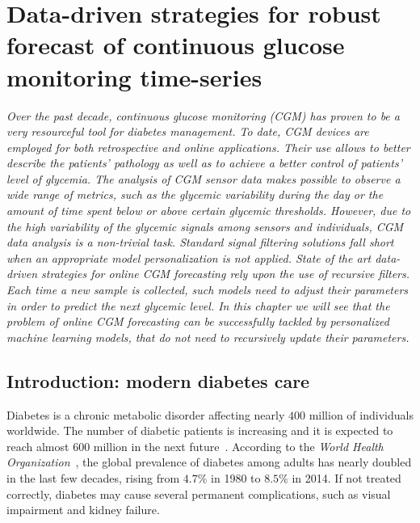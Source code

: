 
\chapter{Data-driven strategies for robust forecast of continuous glucose monitoring time-series} \label{chap:diabete}

\begin{displayquote}
\textit{Over the past decade, continuous glucose monitoring (CGM) has proven to be a very resourceful tool for diabetes management. To date, CGM devices are employed for both retrospective and online applications. Their use allows to better describe the patients' pathology as well as to achieve a better control  of  patients' level of glycemia. The analysis of CGM sensor data makes possible to observe a wide range of metrics, such as the glycemic variability during the day or the amount of time spent below or above certain glycemic thresholds. However, due to the high variability of the glycemic signals among sensors and individuals, CGM data analysis is a non-trivial task. Standard signal filtering solutions fall short when an appropriate model personalization is not applied. State of the art data-driven strategies for online CGM forecasting rely upon the use of recursive filters. Each time a new sample is collected, such models need to adjust their parameters in order to predict the next glycemic level. In this chapter we will see that the problem of online CGM forecasting can be successfully tackled by personalized machine learning models, that do not need to recursively update their parameters.}
\end{displayquote}

\section{Introduction: modern diabetes care}
Diabetes is a chronic metabolic disorder affecting nearly $400$ million of individuals worldwide. The number of diabetic patients is increasing and it is expected to reach almost $600$ million in the next future~\cite{guariguata2014global}.
According to the {\em World Health Organization}~\cite{world2016global}, the global prevalence of diabetes among adults has nearly doubled in the last few decades, rising from $4.7\%$ in 1980 to $8.5\%$ in 2014.
If not treated correctly, diabetes may cause several permanent complications, such as visual impairment and kidney failure. 

